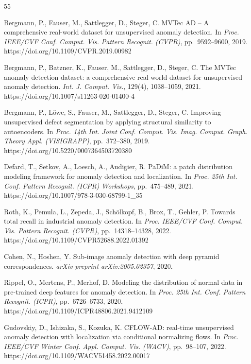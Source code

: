 \documentclass[lettersize,journal]{IEEEtran}
\begin{document}
\begin{thebibliography}{55}



Bergmann, P., Fauser, M., Sattlegger, D., Steger, C. MVTec AD -- A comprehensive real-world dataset for unsupervised anomaly detection. In \textit{Proc. IEEE/CVF Conf. Comput. Vis. Pattern Recognit. (CVPR)}, pp.~9592--9600, 2019. https://doi.org/10.1109/CVPR.2019.00982

Bergmann, P., Batzner, K., Fauser, M., Sattlegger, D., Steger, C. The MVTec anomaly detection dataset: a comprehensive real-world dataset for unsupervised anomaly detection. \textit{Int. J. Comput. Vis.}, 129(4), 1038--1059, 2021. https://doi.org/10.1007/s11263-020-01400-4

Bergmann, P., L\"{o}we, S., Fauser, M., Sattlegger, D., Steger, C. Improving unsupervised defect segmentation by applying structural similarity to autoencoders. In \textit{Proc. 14th Int. Joint Conf. Comput. Vis. Imag. Comput. Graph. Theory Appl. (VISIGRAPP)}, pp.~372--380, 2019. https://doi.org/10.5220/0007364503720380

Defard, T., Setkov, A., Loesch, A., Audigier, R. PaDiM: a patch distribution modeling framework for anomaly detection and localization. In \textit{Proc. 25th Int. Conf. Pattern Recognit. (ICPR) Workshops}, pp.~475--489, 2021. https://doi.org/10.1007/978-3-030-68799-1\_35

Roth, K., Pemula, L., Zepeda, J., Sch\"{o}lkopf, B., Brox, T., Gehler, P. Towards total recall in industrial anomaly detection. In \textit{Proc. IEEE/CVF Conf. Comput. Vis. Pattern Recognit. (CVPR)}, pp.~14318--14328, 2022. https://doi.org/10.1109/CVPR52688.2022.01392

Cohen, N., Hoshen, Y. Sub-image anomaly detection with deep pyramid correspondences. \textit{arXiv preprint arXiv:2005.02357}, 2020.

Rippel, O., Mertens, P., Merhof, D. Modeling the distribution of normal data in pre-trained deep features for anomaly detection. In \textit{Proc. 25th Int. Conf. Pattern Recognit. (ICPR)}, pp.~6726--6733, 2020. https://doi.org/10.1109/ICPR48806.2021.9412109

Gudovskiy, D., Ishizaka, S., Kozuka, K. CFLOW-AD: real-time unsupervised anomaly detection with localization via conditional normalizing flows. In \textit{Proc. IEEE/CVF Winter Conf. Appl. Comput. Vis. (WACV)}, pp.~98--107, 2022. https://doi.org/10.1109/WACV51458.2022.00017


\end{thebibliography}
\end{document}
